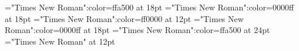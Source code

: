 \documentclass[a4paper]{article}
\begin{document}
 
\pagestyle{plain} 
\font\acmain="Times New Roman":color=ffa500 at 18pt
\font\abenmain="Times New Roman":color=0000ff at 18pt
\font\bmain="Times New Roman":color=ff0000 at 12pt
\font\amain="Times New Roman":color=0000ff at 18pt
\font\abcmain="Times New Roman":color=ffa500 at 24pt
\font\main="Times New Roman" at 12pt

\pagestyle{fancy} 






\end{document}
